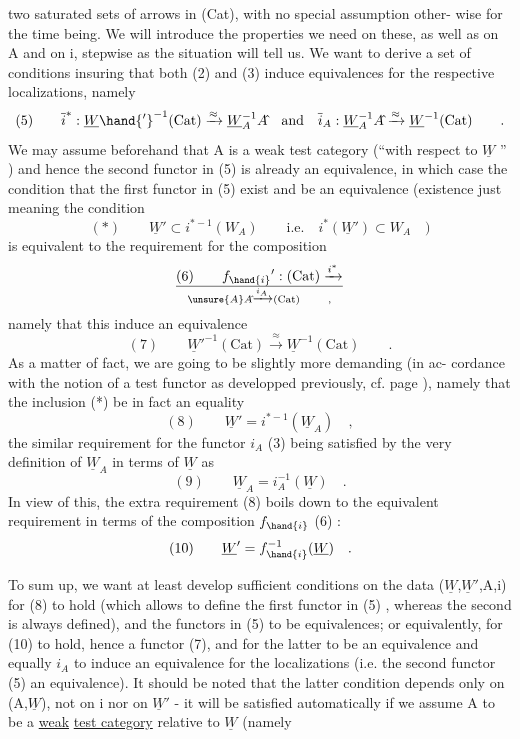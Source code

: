 two saturated sets of arrows in (Cat), with no special assumption other-%
wise for the time being. We will introduce the properties we need on
these, as well as on A and on i, stepwise as the situation will tell us.
We want to derive a set of conditions insuring that both (2) and (3)
induce equivalences for the respective localizations, namely
\[ (5) \qquad \overline{i}^{*} : \underline{W}\hand{'}^{-1}(\mathrm{Cat}) \xrightarrow{\approx} \underline{W}_A^{-1}A\hat{} \quad\text{and}\quad \overline{i}_A : \underline{W}_A^{-1}A\hat{} \xrightarrow{\approx} \underline{W}^{-1}(\mathrm{Cat}) \qquad . \]
We may assume beforehand that A is a weak test category (``with respect to
$\underline{W}$ '' ) and hence the second functor in (5) is already an equivalence,
in which case the condition that the first functor in (5) exist and be an
equivalence (existence just meaning the condition
\[ (*) \qquad \underline{W}' \subset i^{* -1}(W_A) \qquad \text{i.e.} \quad i^{*}(\underline{W}') \subset W_A \quad ) \]
is equivalent to the  requirement for the composition
\[ (6) \qquad f_{\hand{i}}{}' : (\mathrm{Cat}) \xrightarrow{i^{*}} \over{\unsure{A}}{A}\hat{} \xrightarrow{i_A} (\mathrm{Cat}) \qquad , \]
namely that this induce an equivalence
\[ (7) \qquad \underline{W}'^{-1}(\mathrm{Cat}) \xrightarrow{\approx} \underline{W}^{-1}(\mathrm{Cat}) \qquad . \]
As a matter of fact, we are going to be slightly more demanding (in ac-%
cordance with the notion of a  test functor as developped previously,
cf. page  ), namely that the inclusion (*) be in fact an equality
\[ (8) \qquad \underline{W}' = i^{* -1}(\underline{W}_A) \quad , \]
the similar requirement for the functor $i_A$ (3) being satisfied by the
very definition of $\underline{W}_A$ in terms of $\underline{W}$ as
\[ (9) \qquad \underline{W}_A = i_A^{-1}(\underline{W}) \quad . \]
In view of this, the extra requirement (8) boils down to the equivalent
requirement in terms of the composition $f_{\hand{i}}$ (6) :
\[ (10) \qquad \underline{W}' = f_{\hand{i}}^{-1}(\underline{W}) \quad . \]

To sum up, we want at least develop sufficient conditions on the
data ($\underline{W}$,$\underline{W}'$,A,i) for (8) to hold (which allows to define the first
functor in (5) , whereas the second is always defined), and the functors
in (5) to be equivalences; or equivalently, for (10) to hold, hence
a functor (7), and for the latter to be an equivalence\hand{,} and 
 equally $i_A$ to induce an equivalence
for the localizations (i.e. the second functor (5) an equivalence).
It should be noted that the latter condition depends only on (A,$\underline{W}$), not
on i nor on $\underline{W}'$ - it will be satisfied automatically if we assume A to
be a \uline{weak} \uline{test category} relative to $\underline{W}$ (namely 

